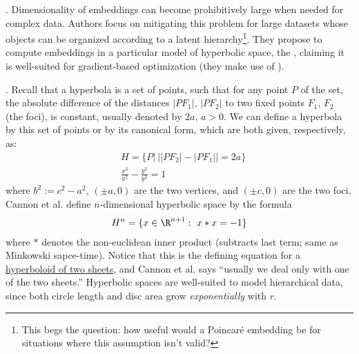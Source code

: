 \documentclass[11pt]{article}
\begin{document}
\p {}. Dimensionality of embeddings can become prohibitively large when needed for complex data. Authors focus on mitigating this problem for large datasets whose objects can be organized according to a latent hierarchy\footnote{This begs the question: how useful would a Poincar\'{e} embedding be for situations where this assumption isn't valid?}. They propose to compute embeddings in a particular model of hyperbolic space, the , claiming it is well-suited for gradient-based optimization (they make use of ).

\myspace
\p {}. Recall that a hyperbola is a set of points, such that for any point $P$ of the set, the absolute difference of the distances $|PF_1|$, $|PF_2|$ to two fixed points $F_1$, $F_2$ (the foci), is constant, usually denoted by $2a$, $a > 0$. We can define a hyperbola by this set of points or by its canonical form, which are both given, respectively, as:
\begin{align}
&H = \{ P | ~ | |PF_2| - |PF_1| | = 2a \} \\
&\frac{x^2}{a^2} - \frac{y^2}{b^2} = 1
\end{align}
where $b^2 := c^2 - a^2$, $(\pm a, 0)$ are the two vertices, and $(\pm c, 0)$ are the two foci. Cannon et al. define $n$-dimensional hyperbolic space by the formula
\begin{align}
H^n = \{x   \in \R^{n+1} : ~ x * x = -1   \}
\end{align}
where $*$ denotes the non-euclidean inner product (subtracts last term; same as Minkowski sapce-time). Notice that this is the defining equation for a  \href{http://mathworld.wolfram.com/Two-SheetedHyperboloid.html}{hyperboloid of two sheets}, and Cannon et al. says ``usually we deal only with one of the two sheets.'' Hyperbolic spaces are well-suited to model hierarchical data, since both circle length and disc area grow \textit{exponentially} with $r$.
\end{document}
